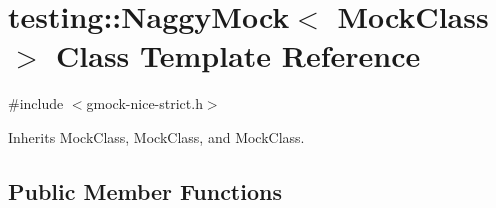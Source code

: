 \hypertarget{classtesting_1_1_naggy_mock}{}\section{testing\+::Naggy\+Mock$<$ Mock\+Class $>$ Class Template Reference}
\label{classtesting_1_1_naggy_mock}


{\ttfamily \#include $<$gmock-\/nice-\/strict.\+h$>$}



Inherits Mock\+Class, Mock\+Class, and Mock\+Class.

\subsection*{Public Member Functions}
